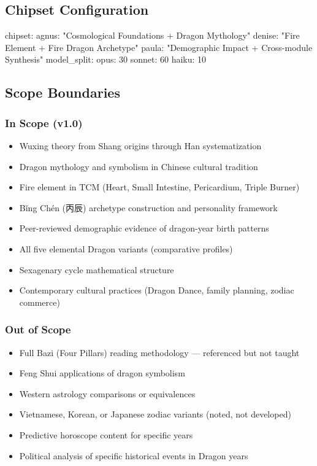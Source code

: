 \documentclass[11pt,letterpaper]{article}
\begin{document}
\subsection{Chipset Configuration}

\begin{asciibox}
chipset:
  agnus: "Cosmological Foundations + Dragon Mythology"
  denise: "Fire Element + Fire Dragon Archetype"
  paula:  "Demographic Impact + Cross-module Synthesis"
  model_split:
    opus:   30%
    sonnet: 60%
    haiku:  10%
\end{asciibox}

\subsection{Scope Boundaries}

\subsubsection{In Scope (v1.0)}
\begin{itemize}[leftmargin=2em]
\item Wuxing theory from Shang origins through Han systematization
\item Dragon mythology and symbolism in Chinese cultural tradition
\item Fire element in TCM (Heart, Small Intestine, Pericardium, Triple Burner)
\item Bǐng Chén (丙辰) archetype construction and personality framework
\item Peer-reviewed demographic evidence of dragon-year birth patterns
\item All five elemental Dragon variants (comparative profiles)
\item Sexagenary cycle mathematical structure
\item Contemporary cultural practices (Dragon Dance, family planning, zodiac commerce)
\end{itemize}

\subsubsection{Out of Scope}
\begin{itemize}[leftmargin=2em]
\item Full Bazi (Four Pillars) reading methodology --- referenced but not taught
\item Feng Shui applications of dragon symbolism
\item Western astrology comparisons or equivalences
\item Vietnamese, Korean, or Japanese zodiac variants (noted, not developed)
\item Predictive horoscope content for specific years
\item Political analysis of specific historical events in Dragon years
\end{itemize}
\end{document}
